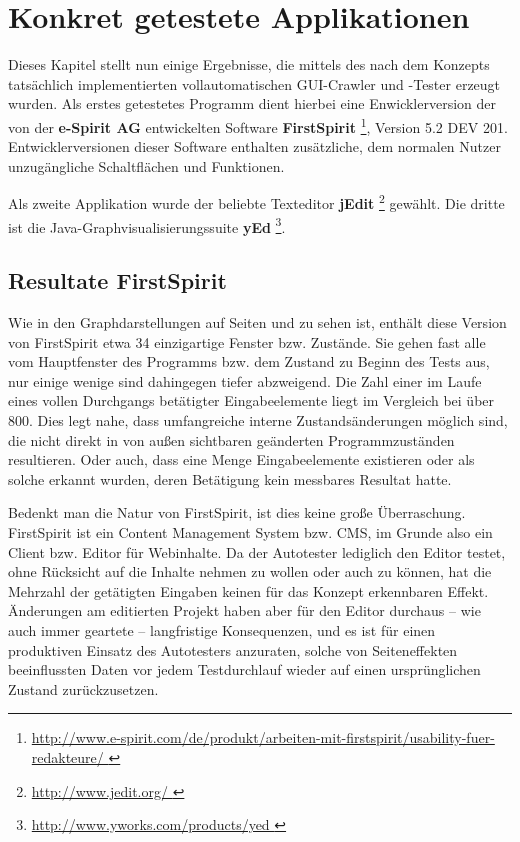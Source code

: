 \chapter{Konkret getestete Applikationen}\label{chapter:concretetests}


Dieses Kapitel stellt nun einige Ergebnisse, die mittels des nach dem Konzepts tatsächlich
implementierten vollautomatischen GUI-Crawler und -Tester erzeugt wurden.
Als erstes getestetes Programm dient hierbei eine Enwicklerversion der von der
\textbf{e-Spirit AG} entwickelten Software \textbf{FirstSpirit} 
\footnote{\url{ http://www.e-spirit.com/de/produkt/arbeiten-mit-firstspirit/usability-fuer-redakteure/ }},
Version 5.2 DEV 201. Entwicklerversionen dieser Software enthalten zusätzliche,
dem normalen Nutzer unzugängliche Schaltflächen und Funktionen.

Als zweite Applikation wurde der beliebte Texteditor \textbf{jEdit}
\footnote{\url{ http://www.jedit.org/ }} gewählt. Die dritte ist
die Java-Graphvisualisierungssuite \textbf{yEd}
\footnote{\url{ http://www.yworks.com/products/yed }}.



\section{Resultate FirstSpirit}\label{section:testresults}

Wie in den Graphdarstellungen auf Seiten \pageref{fig:model_firstspirit_notext} und 
\pageref{fig:model_freespirit_06.10.2015} zu sehen ist, enthält diese Version von
FirstSpirit etwa 34 einzigartige Fenster bzw. Zustände. Sie gehen fast alle vom
Hauptfenster des Programms bzw. dem Zustand zu Beginn des Tests aus,
nur einige wenige sind dahingegen tiefer abzweigend. Die Zahl einer im
Laufe eines vollen Durchgangs betätigter Eingabeelemente liegt im Vergleich bei
über 800. Dies legt nahe, dass umfangreiche interne Zustandsänderungen
möglich sind, die nicht direkt in von außen sichtbaren geänderten
Programmzuständen resultieren. Oder auch, dass eine Menge Eingabeelemente
existieren oder als solche erkannt wurden, deren Betätigung kein messbares
Resultat hatte.

Bedenkt man die Natur von FirstSpirit, ist dies keine große Überraschung.
FirstSpirit ist ein Content Management System bzw. CMS, im Grunde also
ein Client bzw. Editor für Webinhalte. Da der Autotester lediglich den Editor testet,
ohne Rücksicht auf die Inhalte nehmen zu wollen oder auch zu können,
hat die Mehrzahl der getätigten Eingaben keinen für das Konzept erkennbaren
Effekt. Änderungen am editierten Projekt haben aber für den Editor durchaus
-- wie auch immer geartete -- langfristige Konsequenzen, und es ist für
einen produktiven Einsatz des Autotesters anzuraten, solche von Seiteneffekten
beeinflussten Daten vor jedem Testdurchlauf wieder auf einen ursprünglichen
Zustand zurückzusetzen.

